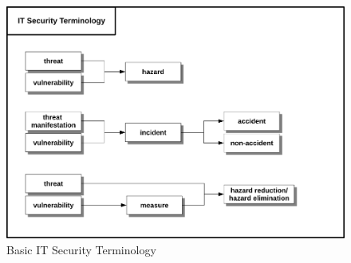 \begin{figure}
\centering
\includegraphics{diagrams/png/itsecterminology.png}
\caption{Basic IT Security Terminology}
\end{figure}
